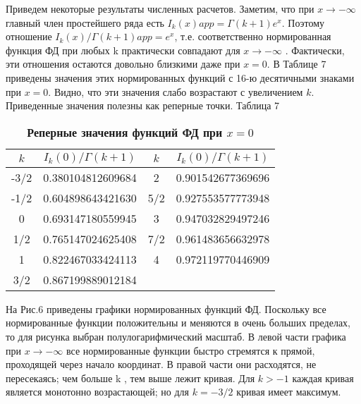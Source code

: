 Приведем некоторые результаты численных расчетов. Заметим, что при
$x \to -\infty$ главный член простейшего ряда есть $I_k(x)app=\Gamma(k+1)e^x$. Поэтому отношение $I_k(x)/\Gamma(k+1)app= e^x$, т.е. соответственно нормированная функция ФД
при любых k практически совпадают для $x \to -\infty$ . Фактически, эти отношения
остаются довольно близкими даже при $x = 0$. В Таблице 7 приведены значения
этих нормированных функций с 16-ю десятичными знаками при $x = 0$. Видно,
что эти значения слабо возрастают с увеличением $k$. Приведенные значения
полезны как реперные точки.
Таблица 7
\begin{table}[]
\caption{\textbf{Реперные значения функций ФД при $x = 0$}}
\begin{center}
\begin{tabular}{|c|c|c|c|}
\hline
$k$ & $I_k(0)/\Gamma(k+1)$ & $k$ & $I_k(0)/\Gamma(k+1)$ \\
\hline
-3/2 & 0.380104812609684 & 2 & 0.901542677369696 \\
-1/2 & 0.604898643421630 & 5/2 & 0.927553577773948 \\
0 & 0.693147180559945 & 3 & 0.947032829497246 \\
1/2 & 0.765147024625408 & 7/2 & 0.961483656632978 \\
1 & 0.822467033424113 & 4 & 0.972119770446909 \\
3/2 & 0.867199889012184 & & \\
\hline
\end{tabular}
\end{center}
\end{table}

На Рис.6 приведены графики нормированных функций ФД. Поскольку все
нормированные функции положительны и меняются в очень больших пределах,
то для рисунка выбран полулогарифмический масштаб. В левой части графика
при $x \to -\infty$ все нормированные функции быстро стремятся к прямой,
проходящей через начало координат. В правой части они расходятся, не
пересекаясь; чем больше k , тем выше лежит кривая. Для $k > -1$ каждая кривая
является монотонно возрастающей; но для $k = -3/2$ кривая имеет максимум.
